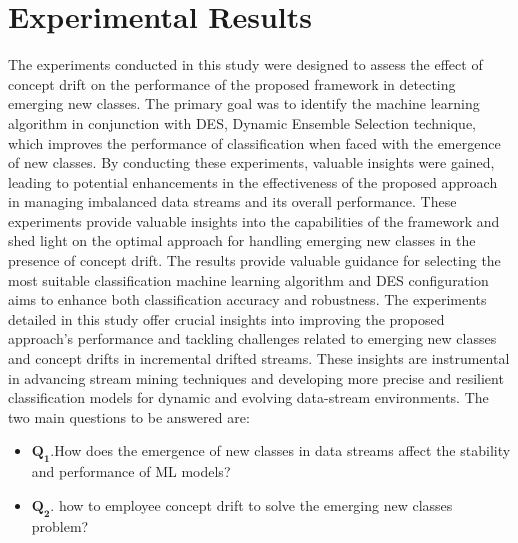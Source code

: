 \section{Experimental Results}
\label{sec:results}
The experiments conducted in this study were designed to assess the effect of concept drift on the performance of the proposed framework in detecting emerging new classes. The primary goal was to identify the machine learning algorithm in conjunction with DES, Dynamic Ensemble Selection technique, which improves the performance of classification when faced with the emergence of new classes. By conducting these experiments, valuable insights were gained, leading to potential enhancements in the effectiveness of the proposed approach in managing imbalanced data streams and its overall performance. These experiments provide valuable insights into the capabilities of the framework and shed light on the optimal approach for handling emerging new classes in the presence of concept drift. The results provide valuable guidance for selecting the most suitable classification machine learning algorithm and DES configuration aims to enhance both classification accuracy and robustness. The experiments detailed in this study offer crucial insights into improving the proposed approach's performance and tackling challenges related to emerging new classes and concept drifts in incremental drifted streams. These insights are instrumental in advancing stream mining techniques and developing more precise and resilient classification models for dynamic and evolving data-stream environments. The two main questions to be answered are:

\begin{itemize}
  
  \item $\pmb{Q_1}$.How does the emergence of new classes in data streams affect the stability and performance of ML models?
  \item $\pmb{Q_2}$. how to employee concept drift to solve the emerging new classes problem? 
  \end{itemize}

